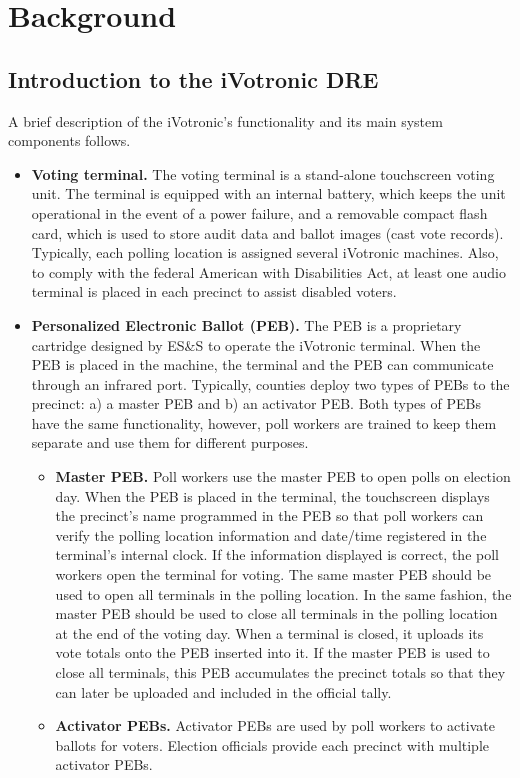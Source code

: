\section{Background}
\label{sec:background}
\subsection{Introduction to the iVotronic DRE}
A brief description of the iVotronic's functionality and its main system components follows.

\begin{itemize} 
\item \textbf{Voting terminal.} The voting terminal is a stand-alone touchscreen voting unit.  The terminal is equipped with an internal battery, which keeps the unit operational in the event of a power failure, and a removable compact flash card, which is used to store audit data and ballot images (cast vote records). Typically, each polling location is assigned several iVotronic machines. Also, to comply with the federal American with Disabilities Act, at least one audio terminal is placed in each precinct to assist disabled voters.

\item \textbf{Personalized Electronic Ballot (PEB).} The PEB is a proprietary cartridge designed by ES\&S to operate the iVotronic terminal.  When the PEB is placed in the machine, the terminal and the PEB can communicate through an infrared port.  Typically, counties deploy two types of PEBs to the precinct: a) a master PEB and b) an activator PEB. Both types of PEBs have the same functionality, however, poll workers are trained to keep them separate and use them for different purposes.
    \begin{itemize}
    \item \textbf{Master PEB.}  Poll workers use the master PEB to open polls on election day. When the PEB is placed in the terminal, the touchscreen displays the precinct's name programmed in the PEB so that poll workers can verify the polling location information and date/time registered in the terminal's internal clock. If the information displayed is correct, the poll workers open the terminal for voting. The same master PEB should be used to open all terminals in the polling location. In the same fashion, the master PEB should be used to close all terminals in the polling location at the end of the voting day. When a terminal is closed, it uploads its vote totals onto the PEB inserted into it. If the master PEB is used to close all terminals, this PEB accumulates the precinct totals so that they can later be uploaded and included in the official tally.
    \item \textbf{Activator PEBs.}  Activator PEBs are used by  poll workers to activate ballots for voters. Election officials provide each precinct with multiple activator PEBs. 
    \end{itemize}
\end{itemize}
